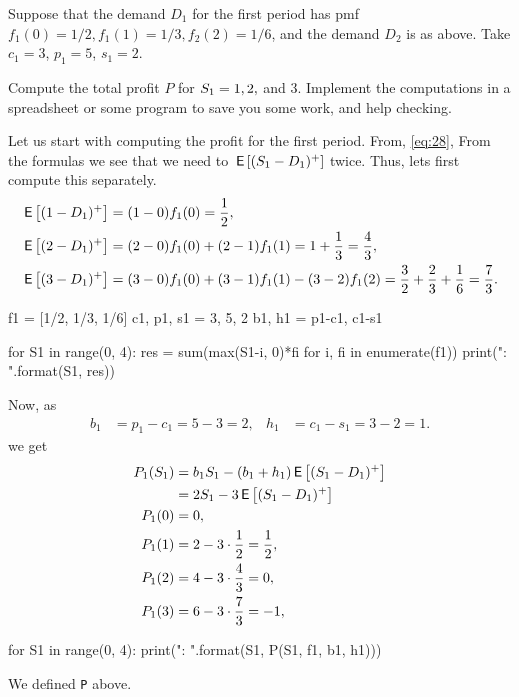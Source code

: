 Suppose that the demand $D_1$ for the first period has pmf $f_1(0)=1/2, f_1(1)=1/3, f_2(2) = 1/6$, 
and the demand $D_2$ is as above. Take $c_{1}=3$, $p_{1}=5$, $s_1=2$. 

\begin{exercise}
Compute the total profit $P$ for $S_1=1, 2,$ and $3$. Implement the computations   in a spreadsheet or some program to save you some work, and help checking.
\begin{solution}
Let us start with computing the profit for the first period. From, \eqref{eq:28}, From the formulas we see that we need to  $\,\mathsf{E}\left[(S_1-D_1)^+\right]$ twice. Thus, lets first compute this separately.
\begin{align*}
  \,\mathsf{E}\left[(1-D_1)^+\right] &= (1-0)f_1(0) = \frac 1 2, \\
  \,\mathsf{E}\left[(2-D_1)^+\right] &= (2-0)f_1(0) + (2-1)f_1(1) = 1 + \frac 1 3 = \frac 4 3, \\
  \,\mathsf{E}\left[(3-D_1)^+\right] &= (3-0)f_1(0) + (3-1)f_1(1) -(3-2) f_1(2) = \frac 3 2 + \frac 2 3 +  \frac 1 6 = \frac 7 3.
\end{align*}


\begin{pyconsole}
f1 = [1/2, 1/3, 1/6]
c1, p1, s1 = 3, 5, 2
b1, h1 = p1-c1, c1-s1


for S1 in range(0, 4):
    res = sum(max(S1-i, 0)*fi for i, fi in enumerate(f1))
    print("{}: {}".format(S1, res))

\end{pyconsole}
  

Now, as
\begin{align*}
  b_1 &= p_1 - c_1 = 5-3 = 2, & h_1 &= c_1 -s_1 = 3-2 = 1.
\end{align*}
we get 
\begin{align*}
P_1(S_1) 
&= b_1S_1 - (b_1+h_1)\,\mathsf{E}\left[(S_1 - D_1)^+\right] \\
&= 2S_1 - 3\,\mathsf{E}\left[(S_1 - D_1)^+\right] \\
P_1(0) &= 0, \\
P_1(1) &= 2 - 3\cdot \frac 1 2 = \frac 1 2, \\
P_1(2) &= 4 - 3\cdot \frac 4 3 = 0, \\
P_1(3) &= 6 - 3\cdot \frac 7 3 = -1, \\
\end{align*}

\begin{pyconsole}
for S1 in range(0, 4):
    print("{}: {}".format(S1, P(S1, f1, b1, h1)))

\end{pyconsole}
We defined \texttt{P} above.
  

\end{solution}
\end{exercise}
